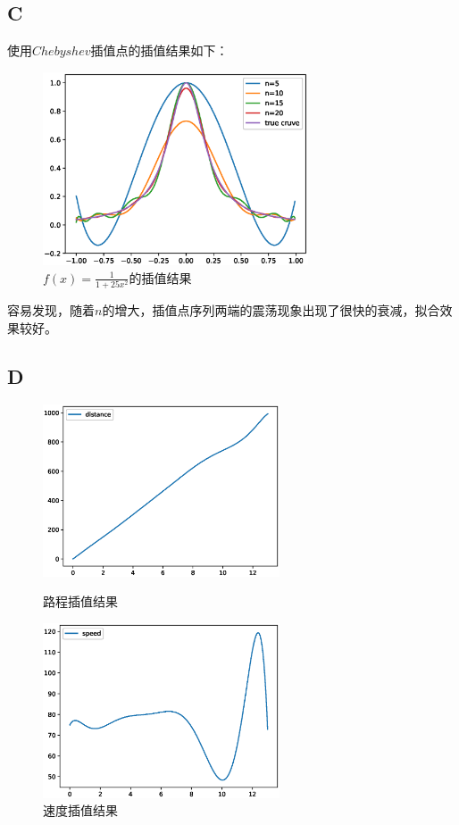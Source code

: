 \documentclass[12]{article}%
\begin{document}
        \subsection{C}
            使用$Chebyshev$插值点的插值结果如下：

            \begin{figure}[H]
                \centering
                \includegraphics[width=0.7\textwidth]{./pic/C.eps}
                \caption{$f(x)=\frac{1}{1+25x^2}$的插值结果}
            \end{figure}

            容易发现，随着$n$的增大，插值点序列两端的震荡现象出现了很快的衰减，拟合效果较好。
        
        \subsection{D}
            \begin{figure}[H]
            \centering
            \begin{minipage}[t]{0.49\textwidth}
            \centering
            \includegraphics[width=7cm]{./pic/D_dis.eps}
            \caption{路程插值结果}
            \end{minipage}
            \begin{minipage}[t]{0.49\textwidth}
            \centering
            \includegraphics[width=7cm]{./pic/D_speed.eps}
            \caption{速度插值结果}
            \end{minipage}
            \end{figure}
\end{document}
